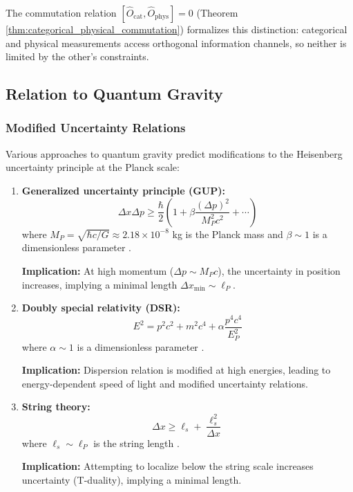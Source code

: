 \documentclass[twocolumn,10pt]{article}
\theoremstyle{remark}
\begin{document}
The commutation relation $[\hat{O}_{\text{cat}}, \hat{O}_{\text{phys}}] = 0$ (Theorem \ref{thm:categorical_physical_commutation}) formalizes this distinction: categorical and physical measurements access orthogonal information channels, so neither is limited by the other's constraints.

\subsection{Relation to Quantum Gravity}

\subsubsection{Modified Uncertainty Relations}

Various approaches to quantum gravity predict modifications to the Heisenberg uncertainty principle at the Planck scale:

\begin{enumerate}
    \item \textbf{Generalized uncertainty principle (GUP):}
    \begin{equation}
        \Delta x \Delta p \geq \frac{\hbar}{2}\left(1 + \beta \frac{(\Delta p)^2}{M_P^2 c^2} + \cdots\right)
        \label{eq:GUP}
    \end{equation}
    where $M_P = \sqrt{\hbar c/G} \approx 2.18 \times 10^{-8}$ kg is the Planck mass and $\beta \sim 1$ is a dimensionless parameter \cite{Maggiore1993,Kempf1995}.
    
    \textbf{Implication:} At high momentum ($\Delta p \sim M_P c$), the uncertainty in position increases, implying a minimal length $\Delta x_{\min} \sim \ell_P$.
    
    \item \textbf{Doubly special relativity (DSR):}
    \begin{equation}
        E^2 = p^2 c^2 + m^2 c^4 + \alpha \frac{p^4 c^4}{E_P^2}
        \label{eq:DSR}
    \end{equation}
    where $\alpha \sim 1$ is a dimensionless parameter \cite{AmelinoCamelia2002}.
    
    \textbf{Implication:} Dispersion relation is modified at high energies, leading to energy-dependent speed of light and modified uncertainty relations.
    
    \item \textbf{String theory:}
    \begin{equation}
        \Delta x \geq \ell_s + \frac{\ell_s^2}{\Delta x}
        \label{eq:string_uncertainty}
    \end{equation}
    where $\ell_s \sim \ell_P$ is the string length \cite{Witten1996}.
    
    \textbf{Implication:} Attempting to localize below the string scale increases uncertainty (T-duality), implying a minimal length.
\end{enumerate}
\end{document}
